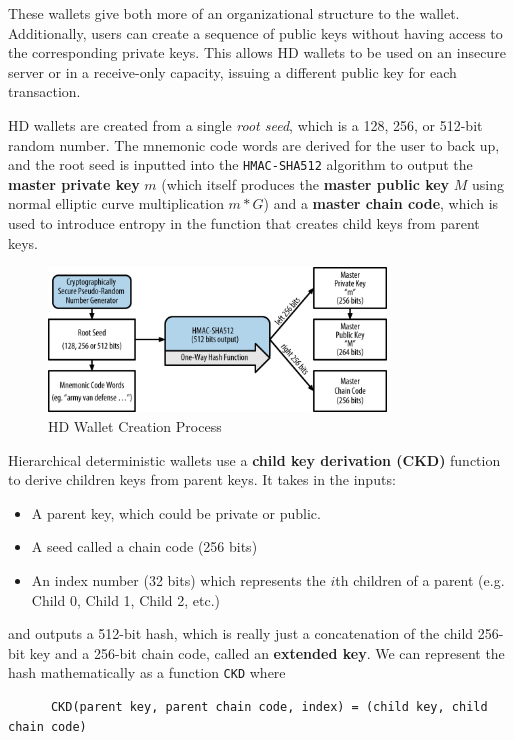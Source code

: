 \documentclass{article}
\begin{document}
    These wallets give both more of an organizational structure to the wallet. Additionally, users can create a sequence of public keys without having access to the corresponding private keys. This allows HD wallets to be used on an insecure server or in a receive-only capacity, issuing a different public key for each transaction.

    HD wallets are created from a single \textit{root seed}, which is a 128, 256, or 512-bit random number. The mnemonic code words are derived for the user to back up, and the root seed is inputted into the \texttt{HMAC-SHA512} algorithm to output the \textbf{master private key} $m$ (which itself produces the \textbf{master public key} $M$ using normal elliptic curve multiplication $m*G$) and a \textbf{master chain code}, which is used to introduce entropy in the function that creates child keys from parent keys.

    \begin{figure}[H]
    \centering
    \includegraphics[width=0.8\textwidth]{img/msbt_0410.png}
    \caption{HD Wallet Creation Process}
    \end{figure}

    Hierarchical deterministic wallets use a \textbf{child key derivation (CKD)} function to derive children keys from parent keys. It takes in the inputs:
    \begin{itemize}
      \item A parent key, which could be private or public.
      \item A seed called a chain code (256 bits)
      \item An index number (32 bits) which represents the $i$th children of a parent (e.g. Child 0, Child 1, Child 2, etc.)
    \end{itemize}
    and outputs a 512-bit hash, which is really just a concatenation of the child 256-bit key and a 256-bit chain code, called an \textbf{extended key}. We can represent the hash mathematically as a function \texttt{CKD} where
    \begin{lstlisting}
      CKD(parent key, parent chain code, index) = (child key, child chain code)
    \end{lstlisting}
\end{document}
